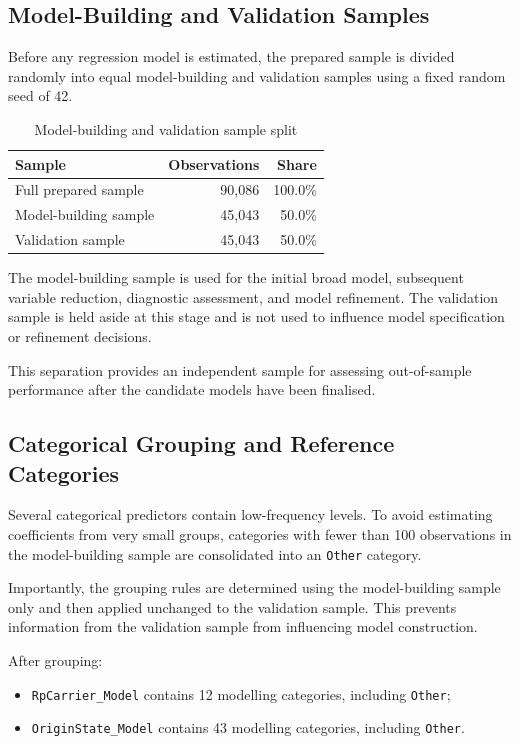 \documentclass[11pt,a4paper]{article}
\begin{document}
\subsection{Model-Building and Validation Samples}

Before any regression model is estimated, the prepared sample is divided randomly into equal model-building and validation samples using a fixed random seed of 42.

\begin{table}[H]
\centering
\caption{Model-building and validation sample split}
\label{tab:sample-split}
\begin{tabular}{lrr}
\toprule
\textbf{Sample} & \textbf{Observations} & \textbf{Share} \\
\midrule
Full prepared sample & 90,086 & 100.0\% \\
Model-building sample & 45,043 & 50.0\% \\
Validation sample & 45,043 & 50.0\% \\
\bottomrule
\end{tabular}
\end{table}

The model-building sample is used for the initial broad model, subsequent variable reduction, diagnostic assessment, and model refinement. The validation sample is held aside at this stage and is not used to influence model specification or refinement decisions.

This separation provides an independent sample for assessing out-of-sample performance after the candidate models have been finalised.

\subsection{Categorical Grouping and Reference Categories}

Several categorical predictors contain low-frequency levels. To avoid estimating coefficients from very small groups, categories with fewer than 100 observations in the model-building sample are consolidated into an \texttt{Other} category.

Importantly, the grouping rules are determined using the model-building sample only and then applied unchanged to the validation sample. This prevents information from the validation sample from influencing model construction.

After grouping:

\begin{itemize}
    \item \texttt{RpCarrier\_Model} contains 12 modelling categories, including \texttt{Other};
    \item \texttt{OriginState\_Model} contains 43 modelling categories, including \texttt{Other}.
\end{itemize}
\end{document}
